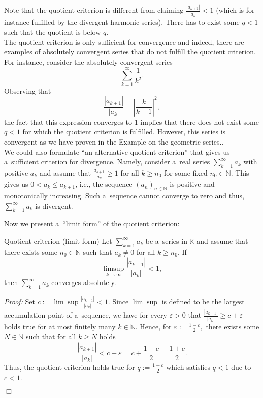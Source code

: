\begin{Remark}{}
Note that the quotient criterion is different from claiming $\frac{|a_{k+1}|}{|a_{k}|}<1$ (which is for instance fulfilled by the divergent harmonic series). 
There has to exist some $q<1$ such that the quotient is below $q$.\\
The quotient criterion is only sufficient for convergence and indeed, there are examples of absolutely convergent 
series that do not fulfill the quotient criterion. For instance, consider the absolutely convergent series
\[\sum_{k=1}^\infty \frac1{k^2}.\]
Observing that
\[\frac{|a_{k+1}|}{|a_{k}|}=\left|\frac{k}{k+1}\right|^2,\]
the fact that this expression converges to $1$ implies that there does not exist some $q<1$ for which the quotient criterion is fulfilled.
 However, this series is convergent as we have proven in the Example on the geometric series..\\
We could also formulate ``an alternative quotient criterion'' that gives us a~sufficient criterion for divergence. 
Namely, consider a~real series $\sum_{k=1}^\infty a_k$ with positive $a_k$ and assume that $\frac{a_{k+1}}{a_{k}}\geq 1$ 
for all $k\geq n_0$ for some fixed $n_0\in\mathbb{N}$. This gives us $0< a_{k}\leq a_{k+1}$, i.e., the sequence $(a_n)_{n\in\mathbb{N}}$ is positive and monotonically increasing. 
Such a~sequence cannot converge to zero and thus, $\sum_{k=1}^\infty a_k$ is divergent.
\end{Remark}
Now we present a~``limit form'' of the quotient criterion:
\begin{Theorem}{Quotient criterion (limit form)}
\label{thm:quotkritlim}
Let $\sum_{k=1}^\infty a_k$ be a~series in $\mathbb{K}$ and assume that there exists some $n_0\in \mathbb{N}$ such that $a_k\neq0$ for all $k\geq n_0$.
If\[\limsup_{k \rightarrow \infty} \frac{|a_{k+1}|}{|a_{k}|}<1,\]
then $\sum_{k=1}^\infty a_k$ converges absolutely.
\end{Theorem}
%
{\em Proof:} Set $c:=\lim\sup\frac{|a_{k+1}|}{|a_{k}|}<1$. Since $\lim\sup$ is defined to be the largest accumulation point of a~sequence, 
we have for every $\varepsilon>0$ that $\frac{|a_{k+1}|}{|a_{k}|}\geq c+\varepsilon$ holds true for at most finitely many $k\in\mathbb{N}$. 
Hence, for $\varepsilon:=\frac{1-c}2,$ there exists some $N\in\mathbb{N}$ such that for all $k\geq N$ holds
\[\frac{|a_{k+1}|}{|a_{k}|}<c+\varepsilon=c+\frac{1-c}2=\frac{1+c}2.\]
Thus, the quotient criterion holds true for $q:=\frac{1+c}2$ which satisfies $q<1$ due to $c<1$.

$\Box$

